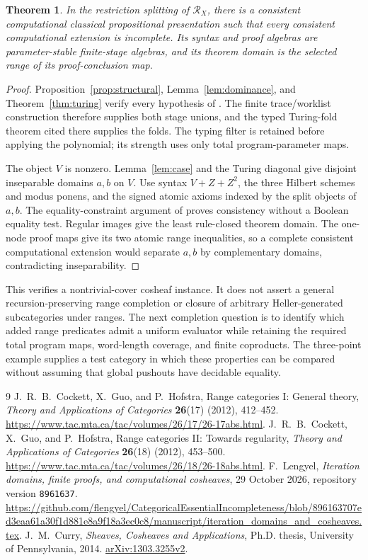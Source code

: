 \documentclass[11pt]{article}
\newtheorem{theorem}{Theorem}[section]
\begin{document}
\begin{theorem}\label{thm:essential}
In the restriction splitting of $\mathscr R_X$, there is a
consistent computational classical propositional presentation
such that every consistent computational extension is incomplete.
Its syntax and proof algebras are parameter-stable finite-stage
algebras, and its theorem domain is the selected range of its
proof-conclusion map.
\end{theorem}
\begin{proof}
Proposition~\ref{prop:structural}, Lemma~\ref{lem:dominance},
and Theorem~\ref{thm:turing} verify every hypothesis of
\cite[Corollary~4.2]{Iteration}. The finite trace/worklist
construction therefore supplies both stage unions, and the
typed Turing-fold theorem cited there supplies the folds.
The typing filter is retained before applying the polynomial;
its strength uses only total program-parameter maps.

The object $V$ is nonzero. Lemma~\ref{lem:case} and the
Turing diagonal give disjoint inseparable domains $a,b$ on $V$.
Use syntax $V+Z+Z^2$, the three Hilbert schemes and modus ponens,
and the signed atomic axioms indexed by the split objects of
$a,b$. The equality-constraint argument of
\cite[Theorem~5.3]{Iteration} proves consistency without a
Boolean equality test. Regular images give the least rule-closed
theorem domain. The one-node proof maps give its two atomic
range inequalities, so a complete consistent computational
extension would separate $a,b$ by complementary domains,
contradicting inseparability.
\end{proof}

This verifies a nontrivial-cover cosheaf instance. It does not
assert a general recursion-preserving range completion or closure
of arbitrary Heller-generated subcategories under ranges.
The next completion question is to identify which added range
predicates admit a uniform evaluator while retaining the required
total program maps, word-length coverage, and finite coproducts.
The three-point example supplies a test category in which these
properties can be compared without assuming that global pushouts
have decidable equality.

\begin{thebibliography}{9}
 J.~R.~B.~Cockett, X.~Guo, and P.~Hofstra,
Range categories I: General theory,
\emph{Theory and Applications of Categories} \textbf{26}(17)
(2012), 412--452.
\url{https://www.tac.mta.ca/tac/volumes/26/17/26-17abs.html}.
 J.~R.~B.~Cockett, X.~Guo, and P.~Hofstra,
Range categories II: Towards regularity,
\emph{Theory and Applications of Categories} \textbf{26}(18)
(2012), 453--500.
\url{https://www.tac.mta.ca/tac/volumes/26/18/26-18abs.html}.
 F.~Lengyel,
\emph{Iteration domains, finite proofs, and computational cosheaves},
29 October 2026, repository version \texttt{8961637}.
\url{https://github.com/flengyel/CategoricalEssentialIncompleteness/blob/896163707ed3eaa61a30f1d881e8a9f18a3ec0c8/manuscript/iteration_domains_and_cosheaves.tex}.
 J.~M.~Curry,
\emph{Sheaves, Cosheaves and Applications}, Ph.D. thesis,
University of Pennsylvania, 2014.
\href{https://arxiv.org/abs/1303.3255}{arXiv:1303.3255v2}.
\end{thebibliography}
\end{document}
